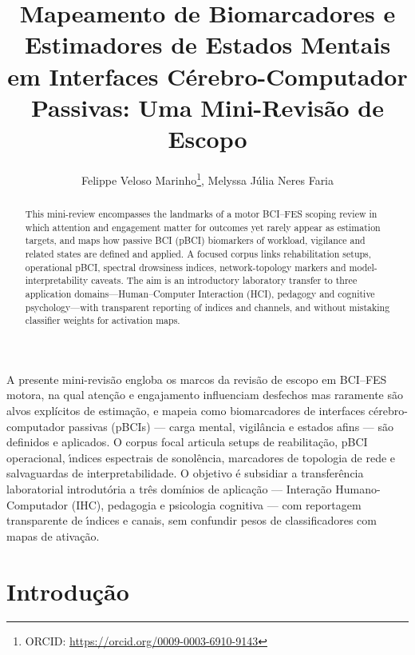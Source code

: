 \documentclass[12pt]{article}
\title{Mapeamento de Biomarcadores e Estimadores de Estados Mentais em Interfaces C\'{e}rebro-Computador Passivas: Uma Mini-Revis\~{a}o de Escopo}
\author{Felippe Veloso Marinho\inst{1}\thanks{ORCID: \url{https://orcid.org/0009-0003-6910-9143}},
        Melyssa J\'{u}lia Neres Faria\inst{1}}
\begin{document}
\maketitle

\begin{abstract}
This mini-review encompasses the landmarks of a motor BCI--FES scoping review in which attention and engagement matter for outcomes yet rarely appear as estimation targets, and maps how passive BCI (pBCI) biomarkers of workload, vigilance and related states are defined and applied. A focused corpus links rehabilitation setups, operational pBCI, spectral drowsiness indices, network-topology markers and model-interpretability caveats. The aim is an introductory laboratory transfer to three application domains---Human--Computer Interaction (HCI), pedagogy and cognitive psychology---with transparent reporting of indices and channels, and without mistaking classifier weights for activation maps.
\end{abstract}

\begin{resumo}
A presente mini-revis\~{a}o engloba os marcos da revis\~{a}o de escopo em BCI--FES motora, na qual aten\c{c}\~{a}o e engajamento influenciam desfechos mas raramente s\~{a}o alvos expl\'{i}citos de estima\c{c}\~{a}o, e mapeia como biomarcadores de interfaces c\'{e}rebro-computador passivas (pBCIs) --- carga mental, vigil\^{a}ncia e estados afins --- s\~{a}o definidos e aplicados. O corpus focal articula setups de reabilita\c{c}\~{a}o, pBCI operacional, \'{\i}ndices espectrais de sonol\^{e}ncia, marcadores de topologia de rede e salvaguardas de interpretabilidade. O objetivo \'{e} subsidiar a transfer\^{e}ncia laboratorial introdut\'{o}ria a tr\^{e}s dom\'{i}nios de aplica\c{c}\~{a}o --- Intera\c{c}\~{a}o Humano-Computador (IHC), pedagogia e psicologia cognitiva --- com reportagem transparente de \'{\i}ndices e canais, sem confundir pesos de classificadores com mapas de ativa\c{c}\~{a}o.
\end{resumo}

\section{Introdu\c{c}\~{a}o}
\end{document}
